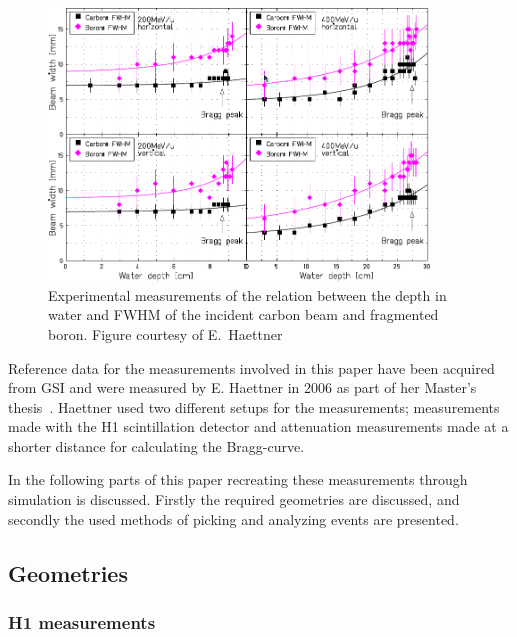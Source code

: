 \begin{figure}[h] 
\begin{center}
\includegraphics[width=0.9\textwidth]{images/haettner48.png}  
\caption{\label{fig:haettner48} Experimental measurements of the relation between the depth in water and FWHM of the incident carbon beam and fragmented boron. Figure courtesy of E.~Haettner~\cite{ehaettner}}
 \end{center}
 \end{figure}

Reference data for the measurements involved in this paper have been acquired from GSI and were measured by E. Haettner in 2006 as part of her Master's thesis~\cite{ehaettner}. Haettner used two different setups for the measurements; measurements made with the H1 scintillation detector and attenuation measurements made at a shorter distance for calculating the Bragg-curve.

In the following parts of this paper recreating these measurements through simulation is discussed. Firstly the required geometries are discussed, and secondly the used methods of picking and analyzing events are presented.

\subsection{Geometries}

\subsubsection{\label{h1measurements}H1 measurements}

